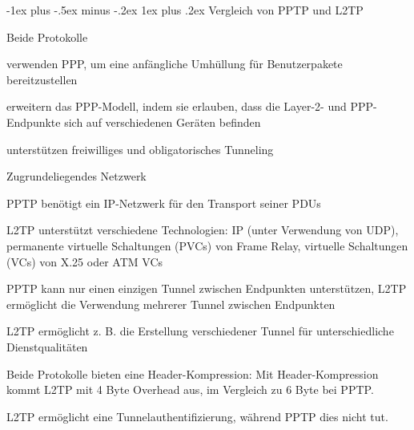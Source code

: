 \documentclass[a4paper]{article}
\makeatletter
\renewcommand{\subsubsection}{\@startsection{subsubsection}{3}{0mm}%
 {-1ex plus -.5ex minus -.2ex}%
 {1ex plus .2ex}%
 {\normalfont\small\bfseries}}
\makeatother
\begin{document}
\begin{multicols}{3}
      \subsubsection{Vergleich von PPTP und L2TP}
      \begin{itemize*}
            \item Beide Protokolle
            \begin{itemize*}
                  \item verwenden PPP, um eine anfängliche Umhüllung für Benutzerpakete bereitzustellen
                  \item erweitern das PPP-Modell, indem sie erlauben, dass die Layer-2- und PPP-Endpunkte sich auf verschiedenen Geräten befinden
                  \item unterstützen freiwilliges und obligatorisches Tunneling
            \end{itemize*}
            \item Zugrundeliegendes Netzwerk
            \begin{itemize*}
                  \item PPTP benötigt ein IP-Netzwerk für den Transport seiner PDUs
                  \item L2TP unterstützt verschiedene Technologien: IP (unter Verwendung von UDP), permanente virtuelle Schaltungen (PVCs) von Frame Relay, virtuelle Schaltungen (VCs) von X.25 oder ATM VCs
            \end{itemize*}
            \item PPTP kann nur einen einzigen Tunnel zwischen Endpunkten unterstützen, L2TP ermöglicht die Verwendung mehrerer Tunnel zwischen Endpunkten
            \begin{itemize*}
                  \item L2TP ermöglicht z. B. die Erstellung verschiedener Tunnel für unterschiedliche Dienstqualitäten
            \end{itemize*}
            \item Beide Protokolle bieten eine Header-Kompression:  Mit Header-Kompression kommt L2TP mit 4 Byte Overhead aus, im Vergleich zu 6 Byte bei PPTP.
            \item L2TP ermöglicht eine Tunnelauthentifizierung, während PPTP dies nicht tut.
      \end{itemize*}


\end{multicols}
\end{document}

